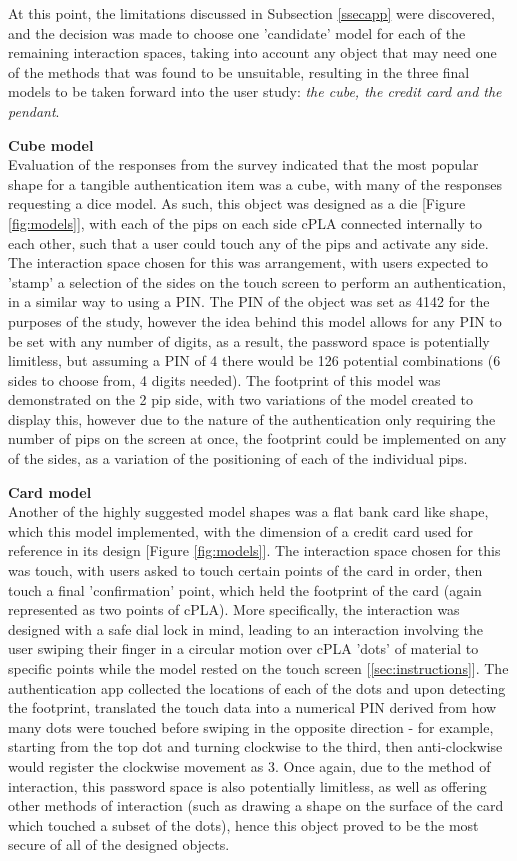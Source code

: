 \documentclass{l4proj}
\begin{document}
At this point, the limitations discussed in Subsection \ref{ssecapp} were discovered, and the decision was made to choose one 'candidate' model for each of the remaining interaction spaces, taking into account any object that may need one of the methods that was found to be unsuitable, resulting in the three final models to be taken forward into the user study: \textit{the cube, the credit card and the pendant}.

\textbf{Cube model}\\
Evaluation of the responses from the survey indicated that the most popular shape for a tangible authentication item was a cube, with many of the responses requesting a dice model. As such, this object was designed as a die [Figure \ref{fig:models}], with each of the pips on each side cPLA connected internally to each other, such that a user could touch any of the pips and activate any side. The interaction space chosen for this was arrangement, with users expected to 'stamp' a selection of the sides on the touch screen to perform an authentication, in a similar way to using a PIN. The PIN of the object was set as 4142 for the purposes of the study, however the idea behind this model allows for any PIN to be set with any number of digits, as a result, the password space is potentially limitless, but assuming a PIN of 4 there would be 126 potential combinations (6 sides to choose from, 4 digits needed). The footprint of this model was demonstrated on the 2 pip side, with two variations of the model created to display this, however due to the nature of the authentication only requiring the number of pips on the screen at once, the footprint could be implemented on any of the sides, as a variation of the positioning of each of the individual pips.

\textbf{Card model}\\
Another of the highly suggested model shapes was a flat bank card like shape, which this model implemented, with the dimension of a credit card used for reference in its design [Figure \ref{fig:models}]. The interaction space chosen for this was touch, with users asked to touch certain points of the card in order, then touch a final 'confirmation' point, which held the footprint of the card (again represented as two points of cPLA). More specifically, the interaction was designed with a safe dial lock in mind, leading to an interaction involving the user swiping their finger in a circular motion over cPLA 'dots' of material to specific points while the model rested on the touch screen [\ref{sec:instructions}]. The authentication app collected the locations of each of the dots and upon detecting the footprint, translated the touch data into a numerical PIN derived from how many dots were touched before swiping in the opposite direction - for example, starting from the top dot and turning clockwise to the third, then anti-clockwise would register the clockwise movement as 3. Once again, due to the method of interaction, this password space is also potentially limitless, as well as offering other methods of interaction (such as drawing a shape on the surface of the card which touched a subset of the dots), hence this object proved to be the most secure of all of the designed objects.
\end{document}
